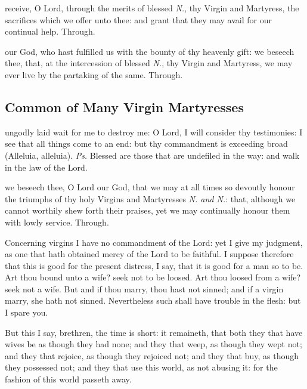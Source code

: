 
\secret
{} receive, O Lord, through the merits of blessed \textit{N.}, thy Virgin and Martyress, the sacrifices which we offer unto thee: and grant that they may avail for our continual help. Through.


\postcommunion
{} our God, who hast fulfilled us with the bounty of thy heavenly gift: we beseech thee, that, at the intercession of blessed \textit{N.}, thy Virgin and Martyress, we may ever live by the partaking of the same. Through.


\subsection{Common of Many Virgin Martyresses}\label{CommonVirginMartyrs}

\introit
{} ungodly laid wait for me to destroy me: O Lord, I will consider thy testimonies: I see that all things come to an end: but thy commandment is exceeding broad (Alleluia, alleluia). \textit{Ps.} Blessed are those that are undefiled in the way: and walk in the law of the Lord.

\collect
{} we beseech thee, O Lord our God, that we may at all times so devoutly honour the triumphs of thy holy Virgins and Martyresses \textit{N. and N.}: that, although we cannot worthily shew forth their praises, yet we may continually honour them with lowly service. Through.

 Concerning virgins I have no commandment of the Lord: yet I give my judgment, as one that hath obtained mercy of the Lord to be faithful. I suppose therefore that this is good for the present distress, I say, that it is good for a man so to be. Art thou bound unto a wife? seek not to be loosed. Art thou loosed from a wife? seek not a wife. But and if thou marry, thou hast not sinned; and if a virgin marry, she hath not sinned. Nevertheless such shall have trouble in the flesh: but I spare you.

But this I say, brethren, the time is short: it remaineth, that both they that have wives be as though they had none; and they that weep, as though they wept not; and they that rejoice, as though they rejoiced not; and they that buy, as though they possessed not; and they that use this world, as not abusing it: for the fashion of this world passeth away.

